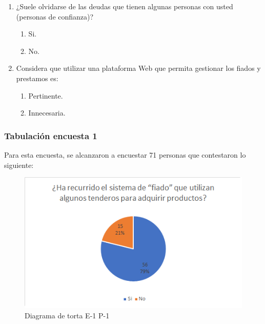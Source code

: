 {\begin{enumerate}
					\begin{enumerate}
						\item Tomo notas en el celular.
						\item Tomo notas en cuadernos o agendas.
						\item No tomo notas.
						\item Otro.
					\end{enumerate}
				
				\item ¿Suele olvidarse de las deudas que tienen algunas personas con usted (personas de confianza)?
				
					\begin{enumerate}
						\item Si.
						\item No.
					\end{enumerate}	
				
				\item Considera que utilizar una plataforma Web que permita gestionar los fiados y prestamos es:
				
					\begin{enumerate}
						\item Pertinente.
						\item Innecesaria.
					\end{enumerate}
				
			\end{enumerate}
		
		\subsubsection*{Tabulación encuesta 1}
		{Para esta encuesta, se alcanzaron a encuestar 71 personas que contestaron lo siguiente:
		
		\begin{figure}[H]
			\centering
			\includegraphics[width=0.8\linewidth]{annexes/e1-p1.png}
			\caption{Diagrama de torta E-1 P-1}
		\end{figure}
	
}}
